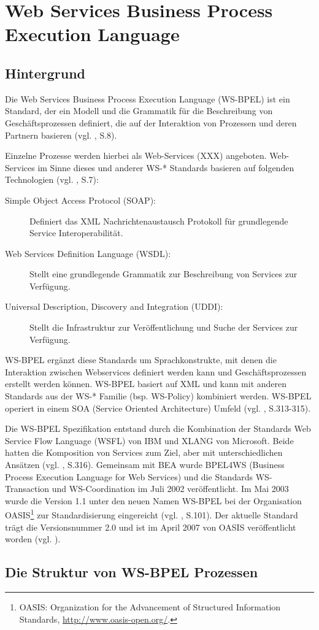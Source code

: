 \section{Web Services Business Process Execution Language}\label{mod-bpel}

\subsection{Hintergrund}
Die Web Services Business Process Execution Language (WS-BPEL) ist ein Standard, der ein Modell und die Grammatik für die Beschreibung von Geschäftsprozessen definiert, die auf der Interaktion von Prozessen und deren Partnern basieren (vgl. \citep{OASIS2007}, S.8).

Einzelne Prozesse werden hierbei als Web-Services (XXX) angeboten. Web-Services im Sinne dieses und anderer WS-* Standards basieren auf folgenden Technologien (vgl. \citep{OASIS2007}, S.7):
\begin{description}
\item[Simple Object Access Protocol (SOAP):] Definiert das XML Nachrichtenaustausch Protokoll für grundlegende Service Interoperabilität.
\item[Web Services Definition Language (WSDL):] Stellt eine grundlegende Grammatik zur Beschreibung von Services zur Verfügung.
\item[Universal Description, Discovery and Integration (UDDI):] Stellt die Infrastruktur zur Veröffentlichung und Suche der Services zur Verfügung.
\end{description}

WS-BPEL ergänzt diese Standards um Sprachkonstrukte, mit denen die Interaktion zwischen Webservices definiert werden kann und Geschäftsprozessen erstellt werden können. WS-BPEL basiert auf XML und kann mit anderen Standards aus der WS-* Familie (bsp. WS-Policy) kombiniert werden. WS-BPEL operiert in einem SOA (Service Oriented Architecture) Umfeld (vgl. \citep{BPEL1}, S.313-315).

Die WS-BPEL Spezifikation entstand durch die Kombination der Standards Web Service Flow Language (WSFL) von IBM und XLANG von Microsoft. Beide hatten die Komposition von Services zum Ziel, aber mit unterschiedlichen Ansätzen (vgl. \citep{BPEL1}, S.316). Gemeinsam mit BEA wurde BPEL4WS (Business Process Execution Language for Web Services) und die Standards WS-Transaction und WS-Coordination im Juli 2002 veröffentlicht. Im Mai 2003 wurde die Version 1.1 unter den neuen Namen WS-BPEL bei der Organisation OASIS\footnote{OASIS: Organization for the Advancement of Structured Information Standards, \url{http://www.oasis-open.org/}.} zur Standardisierung eingereicht (vgl. \citep{BPEL2}, S.101). Der aktuelle Standard trägt die Versionsnummer 2.0 und ist im April 2007 von OASIS veröffentlicht worden (vgl. \citep{OASIS2007}).

\subsection{Die Struktur von WS-BPEL Prozessen}









